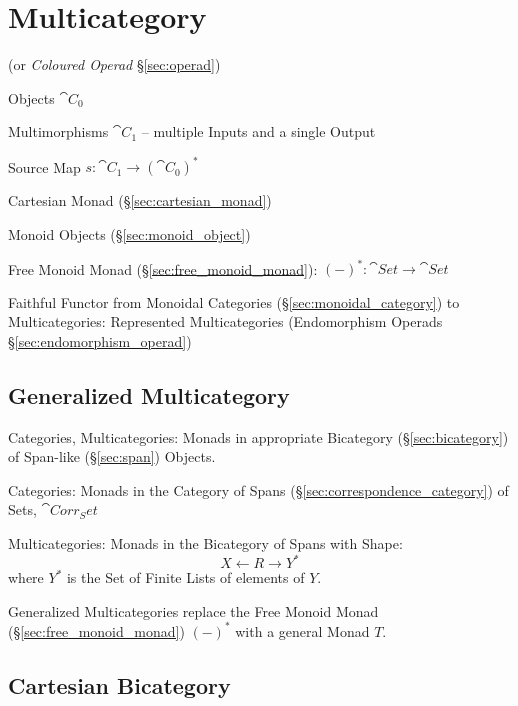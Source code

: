 \section{Multicategory}\label{sec:multicategory}

(or \emph{Coloured Operad} \S\ref{sec:operad})

Objects $\cat{C}_0$

Multimorphisms $\cat{C}_1$ -- multiple Inputs and a single Output

Source Map $s : \cat{C}_1 \rightarrow (\cat{C}_0)^*$

Cartesian Monad (\S\ref{sec:cartesian_monad})

Monoid Objects (\S\ref{sec:monoid_object})

Free Monoid Monad (\S\ref{sec:free_monoid_monad}): $(-)^* : \cat{Set}
\rightarrow \cat{Set}$

Faithful Functor from Monoidal Categories
(\S\ref{sec:monoidal_category}) to Multicategories: Represented
Multicategories (Endomorphism Operads \S\ref{sec:endomorphism_operad})



\subsection{Generalized Multicategory}
\label{sec:generalized_multicategory}

Categories, Multicategories: Monads in appropriate Bicategory
(\S\ref{sec:bicategory}) of Span-like (\S\ref{sec:span}) Objects.

Categories: Monads in the Category of Spans
(\S\ref{sec:correspondence_category}) of Sets, $\cat{Corr_Set}$

Multicategories: Monads in the Bicategory of Spans with Shape:
\[
  X \leftarrow R \rightarrow Y^*
\]
where $Y^*$ is the Set of Finite Lists of elements of $Y$.

Generalized Multicategories replace the Free Monoid Monad
(\S\ref{sec:free_monoid_monad}) $(-)^*$ with a general Monad $T$.



\subsection{Cartesian Bicategory}\label{sec:cartesian_bicategory}

